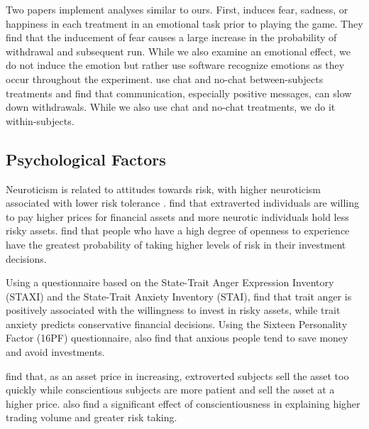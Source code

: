 \documentclass[11pt]{article}
\begin{document}
Two papers implement analyses similar to ours. First, \cite{dijk2017bank} induces fear, sadness, or happiness in each treatment in an emotional task prior to playing the game. They find that the inducement of fear causes a large increase in the probability of withdrawal and subsequent run. While we also examine an emotional effect, we do not induce the emotion but rather use software recognize emotions as they occur throughout the experiment. \cite{shakina2018coordination} use chat and no-chat between-subjects treatments and find that communication, especially positive messages, can slow down withdrawals. While we also use chat and no-chat treatments, we do it within-subjects. 



\subsection{Psychological Factors}



Neuroticism is related to attitudes towards risk, with higher neuroticism associated with lower risk tolerance \citep{rustichini2016toward}.  \cite{oehler2018investors} find that extraverted individuals are willing to pay higher prices for financial assets and more neurotic individuals hold less risky assets. \cite{de2019personality} find that people who have a high degree of openness to experience have the greatest probability of taking higher levels of risk in their investment decisions.



Using a questionnaire based on the State-Trait Anger Expression Inventory (STAXI) and the State-Trait Anxiety Inventory (STAI), \cite{gambetti2012effect} find that trait anger is positively associated with the willingness to invest in risky assets, while trait anxiety predicts conservative financial decisions. Using the Sixteen Personality Factor (16PF) questionnaire, \cite{gambetti2019personality} also find that anxious people tend to save money and avoid investments.



\cite{cecchini2019individual}  find that, as an asset price in increasing,  extroverted subjects sell the asset too quickly while conscientious subjects are more patient and sell the asset at a higher price. \cite{bajo2023psychological} also find a significant effect of  conscientiousness in explaining higher trading volume and greater risk taking.
\end{document}
